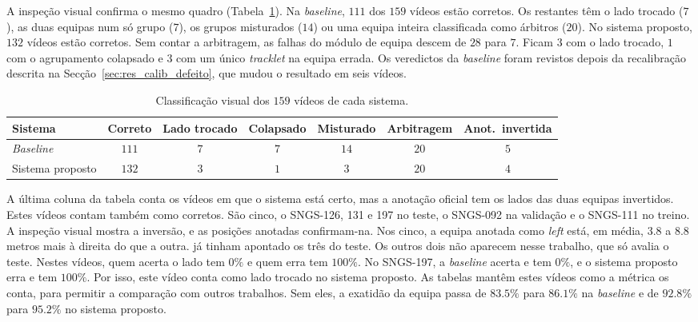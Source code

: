 A inspeção visual confirma o mesmo quadro (Tabela~\ref{tab:visual}). Na \emph{baseline}, $111$ dos $159$ vídeos estão corretos. Os restantes têm o lado trocado ($7$), as duas equipas num só grupo ($7$), os grupos misturados ($14$) ou uma equipa inteira classificada como árbitros ($20$). No sistema proposto, $132$ vídeos estão corretos. Sem contar a arbitragem, as falhas do módulo de equipa descem de $28$ para $7$. Ficam $3$ com o lado trocado, $1$ com o agrupamento colapsado e $3$ com um único \emph{tracklet} na equipa errada. Os veredictos da \emph{baseline} foram revistos depois da recalibração descrita na Secção~\ref{sec:res_calib_defeito}, que mudou o resultado em seis vídeos.

\begin{table}[H]
    \centering
    \caption{Classificação visual dos $159$ vídeos de cada sistema.}
    \label{tab:visual}
    \begin{tabular}{|l|c|c|c|c|c|c|}
        \hline
        \textbf{Sistema} & \textbf{Correto} & \textbf{Lado trocado} & \textbf{Colapsado} & \textbf{Misturado} & \textbf{Arbitragem} & \textbf{Anot.\ invertida} \\
        \hline
        \emph{Baseline}  & $111$ & $7$ & $7$ & $14$ & $20$ & $5$ \\
        \hline
        Sistema proposto & $132$ & $3$ & $1$ & $3$  & $20$ & $4$ \\
        \hline
    \end{tabular}
\end{table}

A última coluna da tabela conta os vídeos em que o sistema está certo, mas a anotação oficial tem os lados das duas equipas invertidos. Estes vídeos contam também como corretos. São cinco, o SNGS-126, 131 e 197 no teste, o SNGS-092 na validação e o SNGS-111 no treino. A inspeção visual mostra a inversão, e as posições anotadas confirmam-na. Nos cinco, a equipa anotada como \emph{left} está, em média, $3.8$ a $8.8$ metros mais à direita do que a outra. \citet{oo2026broadcast2pitch} já tinham apontado os três do teste. Os outros dois não aparecem nesse trabalho, que só avalia o teste. Nestes vídeos, quem acerta o lado tem $0\%$ e quem erra tem $100\%$. No SNGS-197, a \emph{baseline} acerta e tem $0\%$, e o sistema proposto erra e tem $100\%$. Por isso, este vídeo conta como lado trocado no sistema proposto. As tabelas mantêm estes vídeos como a métrica os conta, para permitir a comparação com outros trabalhos. Sem eles, a exatidão da equipa passa de $83.5\%$ para $86.1\%$ na \emph{baseline} e de $92.8\%$ para $95.2\%$ no sistema proposto.

